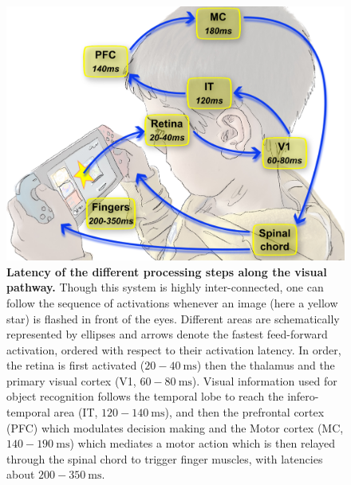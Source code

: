 \documentclass[brainsci, %
               review,submit,pdftex,moreauthors
               ]{Definitions/mdpi}
\newcommand{\ms}{\si{\milli\second}}%
\begin{document}
\begin{figure}
\centering
\includegraphics[width=.75\textwidth]{figures/visual-latency.pdf}
\caption{{\bf Latency of the different processing steps along the visual pathway.} Though this system is highly inter-connected, one can follow the sequence of activations whenever an image (here a yellow star) is flashed in front of the eyes. Different areas are schematically represented by ellipses and arrows denote the fastest feed-forward activation, ordered with respect to their activation latency. In order, the retina is first activated ($20-40~\ms$) then the thalamus and the primary visual cortex (V1, $60-80~\ms$). Visual information used for object recognition follows the temporal lobe to reach the infero-temporal area (IT, $120-140~\ms$), and then the prefrontal cortex (PFC) which modulates decision making and the Motor cortex (MC, $140-190~\ms$) which mediates a motor action which is then relayed through the spinal chord to trigger finger muscles, with latencies about $200-350~\ms$.}\label{fig:thorpe}
\end{figure}
\end{document}
